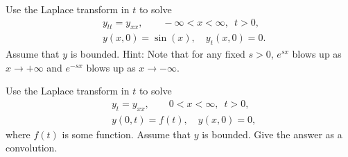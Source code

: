 \begin{exercise}
Use the Laplace transform in $t$ to solve
\begin{align*}
& y_{tt} = y_{xx}, \qquad -\infty < x < \infty, \enspace t > 0,\\
& y(x,0) = \sin(x), \quad  y_t(x,0) = 0 .
\end{align*}
Assume that $y$ is bounded.
Hint: Note that for any fixed $s > 0$,
$e^{sx}$ blows up as $x \to +\infty$
and
$e^{-sx}$ blows up as $x \to -\infty$.
\end{exercise}

\begin{exercise}
Use the Laplace transform in $t$ to solve
\begin{align*}
& y_{t} = y_{xx}, \qquad 0 < x < \infty, \enspace t > 0,\\
& y(0,t) = f(t), \quad  y(x,0) = 0 ,
\end{align*}
where $f(t)$ is some function.
Assume that $y$ is bounded.
Give the answer as a convolution.
\end{exercise}
